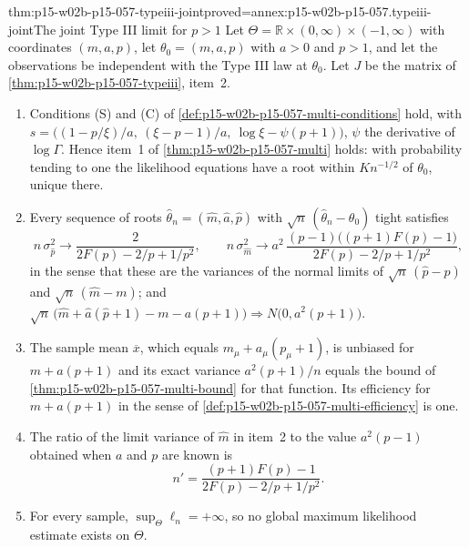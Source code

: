 \begin{hbtheorem}{thm:p15-w02b-p15-057-typeiii-joint}{proved=annex:p15-w02b-p15-057.typeiii-joint}{The joint Type III limit for \(p>1\)}
Let \(\Theta=\mathbb R\times(0,\infty)\times(-1,\infty)\) with
coordinates \((m,a,p)\), let \(\theta_0=(m,a,p)\) with \(a>0\) and
\(p>1\), and let the observations be independent with the Type III law at
\(\theta_0\). Let \(J\) be the matrix of
\cref{thm:p15-w02b-p15-057-typeiii}, item~2.
\begin{enumerate}
\item Conditions (S) and (C) of
 \cref{def:p15-w02b-p15-057-multi-conditions} hold, with
 \(s=\bigl((1-p/\xi)/a,\ (\xi-p-1)/a,\ \log\xi-\psi(p+1)\bigr)\),
 \(\psi\) the derivative of \(\log\Gamma\). Hence item~1 of
 \cref{thm:p15-w02b-p15-057-multi} holds: with probability tending to
 one the likelihood equations have a root within \(Kn^{-1/2}\) of
 \(\theta_0\), unique there.
\item Every sequence of roots \(\widehat\theta_n=(\hat m,\hat a,\hat p)\)
 with \(\sqrt n\,(\widehat\theta_n-\theta_0)\) tight satisfies
 \[
  n\,\sigma_{\hat p}^2\to\frac{2}{2F(p)-2/p+1/p^2},\qquad
  n\,\sigma_{\hat m}^2\to a^2\,\frac{(p-1)\bigl((p+1)F(p)-1\bigr)}
  {2F(p)-2/p+1/p^2},
 \]
 in the sense that these are the variances of the normal limits of
 \(\sqrt n\,(\hat p-p)\) and \(\sqrt n\,(\hat m-m)\); and
 \(\sqrt n\,\bigl(\hat m+\hat a(\hat p+1)-m-a(p+1)\bigr)\Rightarrow
 N\bigl(0,a^2(p+1)\bigr)\).
\item The sample mean \(\overline x\), which equals
 \(m_\mu+a_\mu(p_\mu+1)\), is unbiased for \(m+a(p+1)\) and its exact
 variance \(a^2(p+1)/n\) equals the bound of
 \cref{thm:p15-w02b-p15-057-multi-bound} for that function. Its
 efficiency for \(m+a(p+1)\) in the sense of
 \cref{def:p15-w02b-p15-057-multi-efficiency} is one.
\item The ratio of the limit variance of \(\hat m\) in item~2 to the value
 \(a^2(p-1)\) obtained when \(a\) and \(p\) are known is
 \[
  n'=\frac{(p+1)F(p)-1}{2F(p)-2/p+1/p^2}.
 \]
\item For every sample, \(\sup_{\Theta}\ell_n=+\infty\), so no global
 maximum likelihood estimate exists on \(\Theta\).
\end{enumerate}
\end{hbtheorem}


